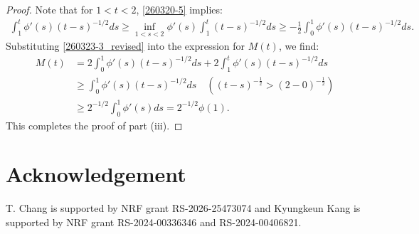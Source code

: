 \documentclass{amsart}
\numberwithin{equation}{section}
\begin{document}
\begin{proof}
Note that for $1 < t < 2$, \eqref{260320-5} implies:
\begin{align}\label{260323-3_revised}
\int_1^t \phi'(s) (t - s)^{-1/2} ds \geq \inf_{1 < s<2} \phi'(s) \int_1^t  (t - s)^{-1/2} ds\geq -\frac{1}{2} \int_0^1 \phi'(s) (t - s)^{-1/2} ds.
\end{align}
Substituting \eqref{260323-3_revised} into the expression for $M(t)$, we find:
\begin{align*}
M(t) &= 2 \int_0^1 \phi'(s) (t - s)^{-1/2} ds + 2 \int_1^t \phi'(s) (t - s)^{-1/2} ds \\
&\geq \int_0^1 \phi'(s) (t - s)^{-1/2} ds \quad ( (t-s)^{-\frac12} > ( 2-0)^{-\frac12} ) \\
&\geq 2^{-1/2} \int_0^1 \phi'(s) ds = 2^{-1/2} \phi(1).
\end{align*}
 This completes the proof of part (iii).

 \end{proof}
 
\section*{Acknowledgement}
T. Chang is supported by NRF grant  RS-2026-25473074 and  Kyungkeun Kang is supported by NRF grant  RS-2024-00336346 and RS-2024-00406821.

 
 
\end{document}
